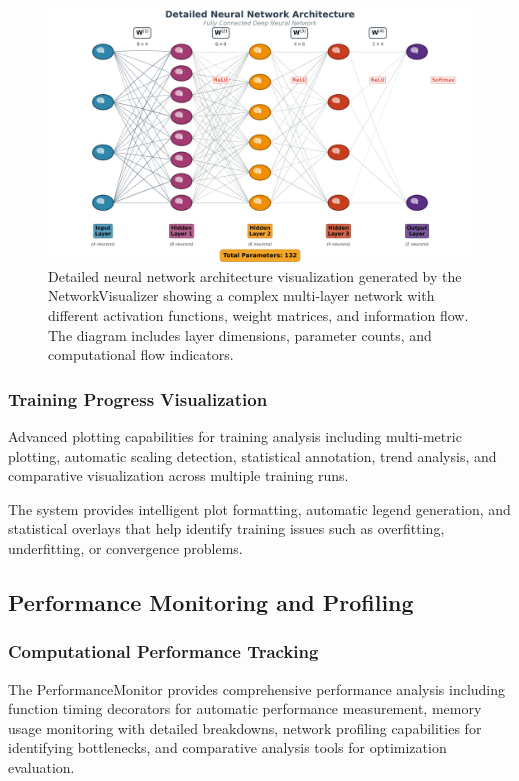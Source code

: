 \documentclass[11pt,a4paper]{report}
\begin{document}
\begin{figure}[H]
\centering
\includegraphics[width=\textwidth]{network_architecture_detailed.png}
\caption{Detailed neural network architecture visualization generated by the NetworkVisualizer showing a complex multi-layer network with different activation functions, weight matrices, and information flow. The diagram includes layer dimensions, parameter counts, and computational flow indicators.}
\label{fig:network_viz}
\end{figure}

\subsubsection{Training Progress Visualization}

Advanced plotting capabilities for training analysis including multi-metric plotting, automatic scaling detection, statistical annotation, trend analysis, and comparative visualization across multiple training runs.

The system provides intelligent plot formatting, automatic legend generation, and statistical overlays that help identify training issues such as overfitting, underfitting, or convergence problems.

\subsection{Performance Monitoring and Profiling}

\subsubsection{Computational Performance Tracking}

The PerformanceMonitor provides comprehensive performance analysis including function timing decorators for automatic performance measurement, memory usage monitoring with detailed breakdowns, network profiling capabilities for identifying bottlenecks, and comparative analysis tools for optimization evaluation.
\end{document}
